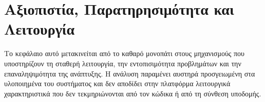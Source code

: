 \chapter{Αξιοπιστία, Παρατηρησιμότητα και Λειτουργία}
\label{ch:reliability_observability}

Το κεφάλαιο αυτό μετακινείται από το καθαρό  μονοπάτι στους μηχανισμούς που υποστηρίζουν τη σταθερή λειτουργία, την εντοπισιμότητα προβλημάτων και την επαναληψιμότητα της ανάπτυξης. Η ανάλυση παραμένει αυστηρά προσγειωμένη στα υλοποιημένα  του συστήματος και δεν αποδίδει στην πλατφόρμα λειτουργικά χαρακτηριστικά που δεν τεκμηριώνονται από τον κώδικα ή από τη σύνθεση υποδομής.



